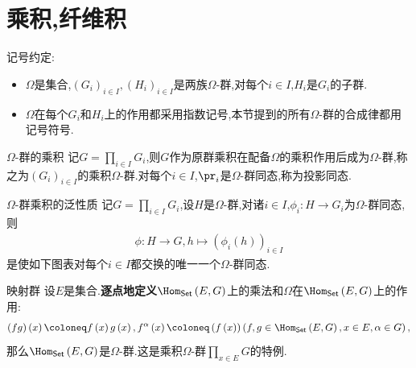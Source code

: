 \section{乘积,纤维积}

记号约定:
\begin{itemize}
	\item $\Omega$是集合,$\left(G_{i}\right)_{i\in I},\left(H_{i}\right)_{i\in I}$是两族$\Omega$-群,对每个$i\in I$,$H_{i}$是$G_{i}$的子群.
	\item $\Omega$在每个$G_{i}$和$H_{i}$上的作用都采用指数记号,本节提到的所有$\Omega$-群的合成律都用记号符号.
\end{itemize}

\begin{definition}{$\Omega$-群的乘积}{}
	记$G=\prod\limits_{i\in I}G_{i}$,则$G$作为原群乘积在配备$\Omega$的乘积作用后成为$\Omega$-群,称之为$\left(G_{i}\right)_{i\in I}$的乘积$\Omega$-群.对每个$i\in I$,$\pr_{i}$是$\Omega$-群同态,称为投影同态.
\end{definition}

\begin{proposition}{$\Omega$-群乘积的泛性质}{}
	记$G=\prod\limits_{i\in I}G_{i}$,设$H$是$\Omega$-群,对诸$i\in I$,$\phi_{i}:H\to G_{i}$为$\Omega$-群同态,则
	\begin{align*}
		\phi:H\to G,h\mapsto\left(\phi_{i}\left(h\right)\right)_{i\in I}
	\end{align*}
	是使如下图表对每个$i\in I$都交换的唯一一个$\Omega$-群同态.
	\begin{center}
	\end{center}
\end{proposition}

\begin{example}{映射群}{}
	设$E$是集合.\textbf{逐点地定义}$\Hom_{\mathsf{Set}}\left(E,G\right)$上的乘法和$\Omega$在$\Hom_{\mathsf{Set}}\left(E,G\right)$上的作用:
	\begin{align*}
		\left(fg\right)\left(x\right)\coloneq f\left(x\right)g\left(x\right),f^{\alpha}\left(x\right)\coloneq\left(f\left(x\right)\right)\left(f,g\in\Hom_{\mathsf{Set}}\left(E,G\right),x\in E,\alpha\in G\right),
	\end{align*}
	那么$\Hom_{\mathsf{Set}}\left(E,G\right)$是$\Omega$-群.这是乘积$\Omega$-群$\prod\limits_{x\in E}G$的特例.
\end{example}

